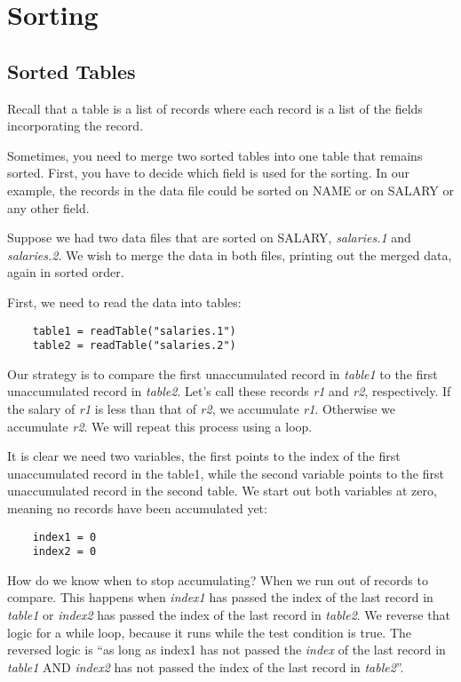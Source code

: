 \chapter{Sorting}
\label{Sorting}

\section*{Sorted Tables}

Recall that a table is a list of records where
each record is a list of the fields incorporating
the record.

Sometimes, you need to merge two sorted tables into
one table that remains sorted. First, you have
to decide which field is used for the
sorting. In our example, the records in the data file
could be sorted on NAME or on SALARY or any other
field.

Suppose we had two data files that are sorted on SALARY,
{\it salaries.1} and {\it salaries.2}.  We wish to merge the data
in both files, printing  out the merged data, again in
sorted order.

First, we need to read the data into tables:

\begin{verbatim}
    table1 = readTable("salaries.1")
    table2 = readTable("salaries.2")
\end{verbatim}

Our strategy is to compare the first unaccumulated
record in {\it table1} to the first unaccumulated record
in {\it table2}. Let's call these records {\it r1} and {\it r2}, respectively.
If the salary of {\it r1} is less than that of {\it r2}, we accumulate
{\it r1}. Otherwise we accumulate {\it r2}.
We will repeat this process using a loop.

It is clear we need two variables, the first points to
the index of the first unaccumulated record in the table1,
while the second variable points to the first unaccumulated
record in the second table.
We start out both variables at zero, meaning no records
have been accumulated yet:

\begin{verbatim}
    index1 = 0
    index2 = 0
\end{verbatim}

How do we know when to stop accumulating? When we
run out of records to compare. This happens
when {\it index1} has passed
the index of the last record in {\it table1} or {\it index2} has passed the
index of the last record in {\it table2}.
We reverse that logic for a while loop, because it runs
while the test condition is true. The reversed logic is
``as long as index1 has not passed the {\it index} of the last record
in {\it table1} AND {\it index2} has not passed the index of the last
record in {\it table2}''.

